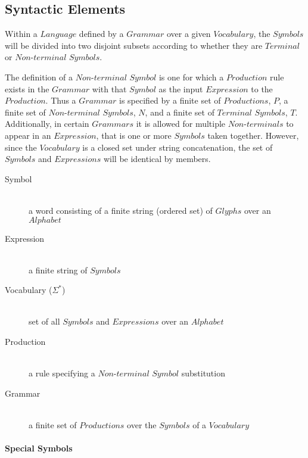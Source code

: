 \documentclass{article}
\begin{document}
\subsection{Syntactic Elements}

Within a $Language$ defined by a $Grammar$ over a given $Vocabulary$,
the $Symbols$ will be divided into two disjoint subsets according to
whether they are $Terminal$ or $Non$-$terminal$ $Symbols$.

The definition of a $Non$-$terminal$ $Symbol$ is one for which a
$Production$ rule exists in the $Grammar$ with that $Symbol$ as the
input $Expression$ to the $Production$. Thus a $Grammar$ is specified
by a finite set of $Productions$, $P$, a finite set of
$Non$-$terminal$ $Symbols$, $N$, and a finite set of $Terminal$
$Symbols$, $T$. Additionally, in certain $Grammars$ it is allowed for
multiple $Non$-$terminals$ to appear in an $Expression$, that is one
or more $Symbols$ taken together. However, since the $Vocabulary$ is a
closed set under string concatenation, the set of $Symbols$ and
$Expressions$ will be identical by members.

    \begin{description}

    \item[Symbol] \hfill \\
    a word consisting of a finite string (ordered set) of $Glyphs$
    over an $Alphabet$

    \item[Expression] \hfill \\
    a finite string of $Symbols$

    \item[Vocabulary ($\Sigma^{*}$)] \hfill \\
    set of all $Symbols$ and $Expressions$ over an $Alphabet$

    \item[Production] \hfill \\
    a rule specifying a $Non$-$terminal$ $Symbol$ substitution

    \item[Grammar] \hfill \\
    a finite set of $Productions$ over the $Symbols$ of a $Vocabulary$

    \end{description}

\paragraph{Special Symbols}
\end{document}
